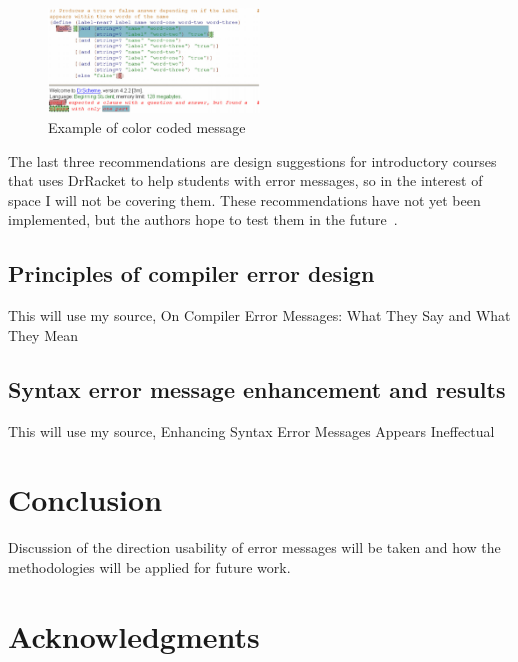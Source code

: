 \documentclass{sig-alternate}
\begin{document}
\begin{figure}
  \centering
  \includegraphics[keepaspectratio, width=0.5\textwidth]{DrRacketColorCodedMessage.png}
  \caption{Example of color coded message}
  \label{fig:colorcodedmessage}
\end{figure}

The last three recommendations are design suggestions for introductory courses that uses DrRacket to help students with error messages, so in the interest of space I will not be covering them.
These recommendations have not yet been implemented, but the authors hope to test them in the future~\cite{Marceau:2011:MYL:2048237.2048241}. 


\subsection{Principles of compiler error design}\label{subsec:compiler error design}
This will use my source, On Compiler Error Messages: What They Say and What They Mean

\subsection{Syntax error message enhancement and results}\label{subsec:syntax enhancement}
This will use my source, Enhancing Syntax Error Messages Appears Ineffectual


\section{Conclusion}\label{sec:concl}
Discussion of the direction usability of error messages will be taken and how the methodologies will be applied for future work.



\section{Acknowledgments}\label{sec:ackn}

\end{document}

